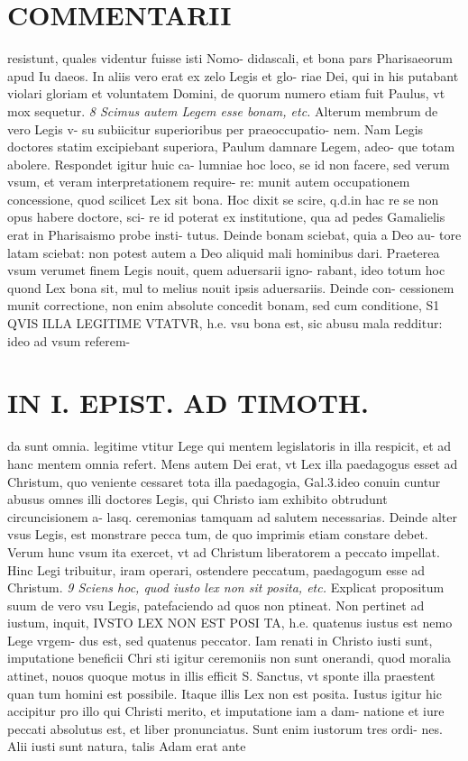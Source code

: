 \documentclass{article}
\begin{document}
\begin{pages}
\section*{COMMENTARII }
\marginpar{[ p.26 ]}\pstart resistunt, quales videntur fuisse isti Nomo- didascali, et bona pars Pharisaeorum apud Iu daeos. In aliis vero erat ex zelo Legis et glo- riae Dei, qui in his putabant violari gloriam et voluntatem Domini, de quorum numero etiam fuit Paulus, vt mox sequetur.  \pend
\textit{8 Scimus autem Legem esse bonam, etc. }\pstart Alterum membrum de vero Legis v- su subiicitur superioribus per praeoccupatio- nem. Nam Legis doctores statim excipiebant superiora, Paulum damnare Legem, adeo- que totam abolere. Respondet igitur huic ca- lumniae hoc loco, se id non facere, sed verum vsum, et veram interpretationem require- re: munit autem occupationem concessione, quod scilicet Lex sit bona. Hoc dixit se scire, q.d.in hac re se non opus habere doctore, sci- re id poterat ex institutione, qua ad pedes Gamalielis erat in Pharisaismo probe insti- tutus. Deinde bonam sciebat, quia a Deo au- tore latam sciebat: non potest autem a Deo aliquid mali hominibus dari. Praeterea vsum verumet finem Legis nouit, quem aduersarii igno- rabant, ideo totum hoc quond Lex bona sit, mul to melius nouit ipsis aduersariis. Deinde con- cessionem munit correctione, non enim absolute concedit bonam, sed cum conditione, S1 QVIS ILLA LEGITIME VTATVR, h.e. vsu bona est, sic abusu mala redditur: ideo ad vsum referem-  \pend
\section*{IN I. EPIST. AD TIMOTH. }
\marginpar{[ p.27 ]}\pstart da sunt omnia. legitime vtitur Lege qui mentem legislatoris in illa respicit, et ad hanc mentem omnia refert. Mens autem Dei erat, vt Lex illa paedagogus esset ad Christum, quo veniente cessaret tota illa paedagogia, Gal.3.ideo conuin cuntur abusus omnes illi doctores Legis, qui Christo iam exhibito obtrudunt circuncisionem a- lasq. ceremonias tamquam ad salutem necessarias. Deinde alter vsus Legis, est monstrare pecca tum, de quo imprimis etiam constare debet. Verum hunc vsum ita exercet, vt ad Christum liberatorem a peccato impellat. Hinc Legi tribuitur, iram operari, ostendere peccatum, paedagogum esse ad Christum.  \pend
\textit{9 Sciens hoc, quod iusto lex non sit posita, etc. }\pstart Explicat propositum suum de vero vsu Legis, patefaciendo ad quos non ptineat. Non pertinet ad iustum, inquit, IVSTO LEX NON EST POSI TA, h.e. quatenus iustus est nemo Lege vrgem- dus est, sed quatenus peccator. Iam renati in Christo iusti sunt, imputatione beneficii Chri sti igitur ceremoniis non sunt onerandi, quod moralia attinet, nouos quoque motus in illis efficit S. Sanctus, vt sponte illa praestent quan tum homini est possibile. Itaque illis Lex non est posita. Iustus igitur hic accipitur pro illo qui Christi merito, et imputatione iam a dam- natione et iure peccati absolutus est, et liber pronunciatus. Sunt enim iustorum tres ordi- nes. Alii iusti sunt natura, talis Adam erat ante  \pend

\end{pages}
\end{document}
